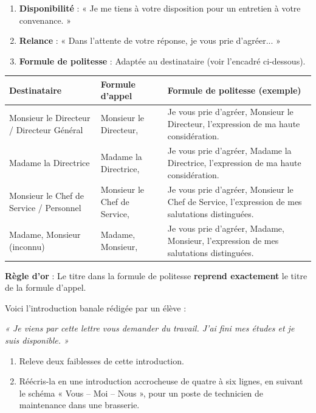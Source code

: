 \documentclass[11pt]{article}
\begin{document}
\begin{methode}
\begin{enumerate}
\item \textbf{Disponibilité} : « Je me tiens à votre disposition pour un entretien à votre convenance. »
\item \textbf{Relance} : « Dans l'attente de votre réponse, je vous prie d'agréer... »
\item \textbf{Formule de politesse} : Adaptée au destinataire (voir l'encadré ci-dessous).
\end{enumerate}
\end{methode}

\begin{aretenir}
\begin{center}
\begin{tabularx}{\linewidth}{|l|X|X|}\hline
\textbf{Destinataire} & \textbf{Formule d'appel} & \textbf{Formule de politesse (exemple)} \\ \hline
Monsieur le Directeur / Directeur Général & Monsieur le Directeur, & Je vous prie d'agréer, Monsieur le Directeur, l'expression de ma haute considération. \\ \hline
Madame la Directrice & Madame la Directrice, & Je vous prie d'agréer, Madame la Directrice, l'expression de ma haute considération. \\ \hline
Monsieur le Chef de Service / Personnel & Monsieur le Chef de Service, & Je vous prie d'agréer, Monsieur le Chef de Service, l'expression de mes salutations distinguées. \\ \hline
Madame, Monsieur (inconnu) & Madame, Monsieur, & Je vous prie d'agréer, Madame, Monsieur, l'expression de mes salutations distinguées. \\ \hline
\end{tabularx}
\end{center}
\textbf{Règle d'or} : Le titre dans la formule de politesse \textbf{reprend exactement} le titre de la formule d'appel.
\end{aretenir}

\begin{exercice}
Voici l'introduction banale rédigée par un élève :
\begin{center}
\emph{« Je viens par cette lettre vous demander du travail. J'ai fini mes études et je suis disponible. »}
\end{center}
\begin{enumerate}
\item Releve deux faiblesses de cette introduction.
\item Réécris-la en une introduction accrocheuse de quatre à six lignes, en suivant le schéma « Vous -- Moi -- Nous », pour un poste de technicien de maintenance dans une brasserie.
\end{enumerate}
\end{exercice}
\end{document}
